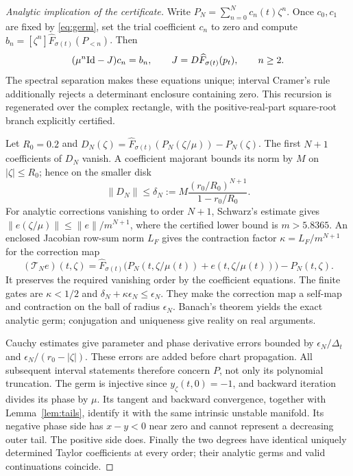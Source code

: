 \begin{proof}[Analytic implication of the certificate]
Write \(P_N=\sum_{n=0}^Nc_n(t)\zeta^n\). Once \(c_0,c_1\) are fixed by
\eqref{eq:germ}, set the trial coefficient \(c_n\) to zero and compute
\(b_n=[\zeta^n]\widehat F_{\sigma(t)}(P_{<n})\). Then
\[
 (\mu^n\mathrm{Id}-J)c_n=b_n,\qquad
 J=D\widehat F_{\sigma(t)}(p_t),\qquad n\ge2.
\]
The spectral separation makes these equations unique; interval Cramer's
rule additionally rejects a determinant enclosure containing zero.
This recursion is regenerated over the complex rectangle, with the
positive-real-part square-root branch explicitly certified.

Let \(R_0=0.2\) and
\(D_N(\zeta)=\widehat F_{\sigma(t)}(P_N(\zeta/\mu))-P_N(\zeta)\).
The first \(N+1\) coefficients of \(D_N\) vanish. A coefficient majorant
bounds its norm by \(M\) on \(|\zeta|\le R_0\); hence on the smaller disk
\[
 \|D_N\|\le
 \delta_N:=M\frac{(r_0/R_0)^{N+1}}{1-r_0/R_0}.
\]
For analytic corrections vanishing to order \(N+1\), Schwarz's estimate
gives \(\|e(\zeta/\mu)\|\le\|e\|/m^{N+1}\), where the certified lower
bound is \(m>5.8365\). An enclosed Jacobian row-sum norm \(L_F\) gives
the contraction factor \(\kappa=L_F/m^{N+1}\) for the correction map
\[
 (\mathcal T_N e)(t,\zeta)=
 \widehat F_{\sigma(t)}
 \bigl(P_N(t,\zeta/\mu(t))+e(t,\zeta/\mu(t))\bigr)-P_N(t,\zeta).
\]
It preserves the required vanishing order by the coefficient equations.
The finite gates are
\(\kappa<1/2\) and \(\delta_N+\kappa\epsilon_N\le\epsilon_N\).
They make the correction map a self-map and contraction on the ball of
radius \(\epsilon_N\). Banach's theorem yields the exact analytic germ;
conjugation and uniqueness give reality on real arguments.

Cauchy estimates give parameter and phase derivative errors bounded by
\(\epsilon_N/\Delta_t\) and \(\epsilon_N/(r_0-|\zeta|)\). These errors
are added before chart propagation. All subsequent interval statements
therefore concern \(P\), not only its polynomial truncation.
The germ is injective since \(y_\zeta(t,0)=-1\), and backward iteration
divides its phase by \(\mu\). Its tangent and backward convergence, together
with Lemma~\ref{lem:tails}, identify it with the same intrinsic unstable
manifold. Its negative phase side has \(x-y<0\) near zero and cannot
represent a decreasing outer tail. The positive side does.
Finally the two degrees have identical uniquely determined Taylor
coefficients at every order; their analytic germs and valid continuations
coincide.
\end{proof}


